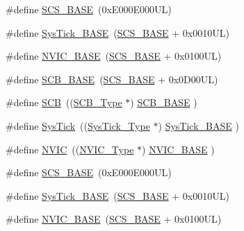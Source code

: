 \begin{DoxyCompactItemize}
\item 
\#define \hyperlink{group___c_m_s_i_s__core__base_ga3c14ed93192c8d9143322bbf77ebf770}{S\+C\+S\+\_\+\+B\+A\+SE}~(0x\+E000\+E000\+U\+L)
\item 
\#define \hyperlink{group___c_m_s_i_s__core__base_ga58effaac0b93006b756d33209e814646}{Sys\+Tick\+\_\+\+B\+A\+SE}~(\hyperlink{group___c_m_s_i_s__core__base_ga3c14ed93192c8d9143322bbf77ebf770}{S\+C\+S\+\_\+\+B\+A\+SE} +  0x0010\+U\+L)
\item 
\#define \hyperlink{group___c_m_s_i_s__core__base_gaa0288691785a5f868238e0468b39523d}{N\+V\+I\+C\+\_\+\+B\+A\+SE}~(\hyperlink{group___c_m_s_i_s__core__base_ga3c14ed93192c8d9143322bbf77ebf770}{S\+C\+S\+\_\+\+B\+A\+SE} +  0x0100\+U\+L)
\item 
\#define \hyperlink{group___c_m_s_i_s__core__base_gad55a7ddb8d4b2398b0c1cfec76c0d9fd}{S\+C\+B\+\_\+\+B\+A\+SE}~(\hyperlink{group___c_m_s_i_s__core__base_ga3c14ed93192c8d9143322bbf77ebf770}{S\+C\+S\+\_\+\+B\+A\+SE} +  0x0\+D00\+U\+L)
\item 
\#define \hyperlink{group___c_m_s_i_s__core__base_gaaaf6477c2bde2f00f99e3c2fd1060b01}{S\+CB}~((\hyperlink{struct_s_c_b___type}{S\+C\+B\+\_\+\+Type}       $\ast$)     \hyperlink{group___c_m_s_i_s__core__base_gad55a7ddb8d4b2398b0c1cfec76c0d9fd}{S\+C\+B\+\_\+\+B\+A\+SE}      )
\item 
\#define \hyperlink{group___c_m_s_i_s__core__base_gacd96c53beeaff8f603fcda425eb295de}{Sys\+Tick}~((\hyperlink{struct_sys_tick___type}{Sys\+Tick\+\_\+\+Type}   $\ast$)     \hyperlink{group___c_m_s_i_s__core__base_ga58effaac0b93006b756d33209e814646}{Sys\+Tick\+\_\+\+B\+A\+SE}  )
\item 
\#define \hyperlink{group___c_m_s_i_s__core__base_gac8e97e8ce56ae9f57da1363a937f8a17}{N\+V\+IC}~((\hyperlink{struct_n_v_i_c___type}{N\+V\+I\+C\+\_\+\+Type}      $\ast$)     \hyperlink{group___c_m_s_i_s__core__base_gaa0288691785a5f868238e0468b39523d}{N\+V\+I\+C\+\_\+\+B\+A\+SE}     )
\item 
\#define \hyperlink{group___c_m_s_i_s__core__base_ga3c14ed93192c8d9143322bbf77ebf770}{S\+C\+S\+\_\+\+B\+A\+SE}~(0x\+E000\+E000\+U\+L)
\item 
\#define \hyperlink{group___c_m_s_i_s__core__base_ga58effaac0b93006b756d33209e814646}{Sys\+Tick\+\_\+\+B\+A\+SE}~(\hyperlink{group___c_m_s_i_s__core__base_ga3c14ed93192c8d9143322bbf77ebf770}{S\+C\+S\+\_\+\+B\+A\+SE} +  0x0010\+U\+L)
\item 
\#define \hyperlink{group___c_m_s_i_s__core__base_gaa0288691785a5f868238e0468b39523d}{N\+V\+I\+C\+\_\+\+B\+A\+SE}~(\hyperlink{group___c_m_s_i_s__core__base_ga3c14ed93192c8d9143322bbf77ebf770}{S\+C\+S\+\_\+\+B\+A\+SE} +  0x0100\+U\+L)

\end{DoxyCompactItemize}
